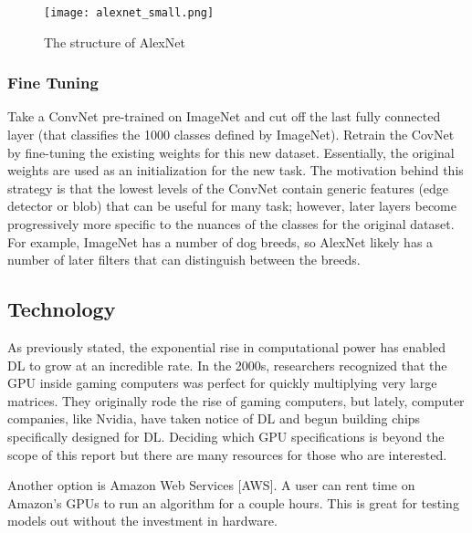 \begin{figure}[!h]
 \begin{center}
 \texttt{[image: alexnet\_small.png]}
 \caption{The structure of AlexNet  \cite{AlexNet}}
 \label{fig:AlexNet}
 \end{center}
\end{figure}

\subsubsection{Fine Tuning}
Take a ConvNet pre-trained on ImageNet and cut off the last fully connected layer (that classifies the 1000 classes defined by ImageNet).  Retrain the CovNet by fine-tuning the existing weights for this new dataset. Essentially, the original weights are used as an initialization for the new task.  The motivation behind this strategy is that the lowest levels of the ConvNet contain generic features (edge detector or blob) that can be useful for many task; however, later layers become progressively more specific to the nuances of the classes for the original dataset.   For example, ImageNet has a number of dog breeds, so AlexNet likely has a number of later filters that can distinguish between the breeds. \cite{Stanf} 


\subsection{Technology}
As previously stated, the exponential rise in computational power has enabled DL to grow at an incredible rate.  In the 2000s, researchers recognized that the GPU inside gaming computers was perfect for quickly multiplying very large matrices.  They originally rode the rise of gaming computers, but lately, computer companies, like Nvidia, have taken notice of DL and begun building chips specifically designed for DL.  Deciding which GPU specifications is beyond the scope of this report but there are many resources for those who are interested. \cite{GPUs}  

Another option is Amazon Web Services [AWS].  A user can rent time on Amazon's GPUs to run an algorithm for a couple hours.  This is great for testing models out without the investment in hardware.  



